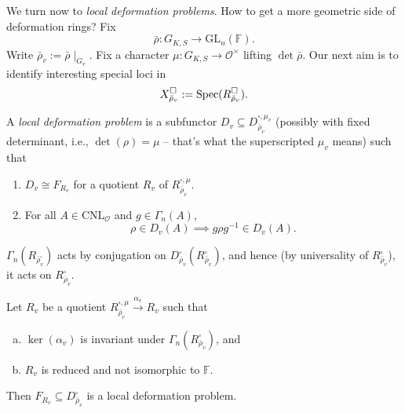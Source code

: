 \documentclass[reqno]{amsart} 
\begin{document}
We turn now to \emph{local deformation problems}.  How to get a more geometric side of deformation rings?  Fix
\begin{equation*}
  \bar{\rho} : G_{K, S} \rightarrow \mathrm{GL}_n(\mathbb{F}).
\end{equation*}
Write $\bar{\rho}_v := \bar{\rho} \mid_{G_v}$.  Fix a character $\mu : G_{K, S} \rightarrow \mathcal{O}^\times$ lifting $\det \bar{\rho}$.  Our next aim is to identify interesting special loci in
\begin{equation*}
  X_{\bar{\rho}_v}^{\square} := \operatorname{Spec}(R_{\bar{\rho}_v}^{\square}).
\end{equation*}
\begin{definition}\label{definition:cq6thpcze8}
  A \emph{local deformation problem} is a subfunctor $D_v \subseteq D_{\bar{\rho}_v}^{\square, \mu_v}$ (possibly with fixed determinant, i.e., $\det(\rho) = \mu$ -- that's what the superscripted $\mu_v$ means) such that
  \begin{enumerate}
  \item\label{enumerate:cq6s0pdihm} $D_v \cong F_{R_v}$ for a quotient $R_v$ of $R_{\bar{\rho}_v}^{\square, \mu}$.
  \item\label{enumerate:cq6s0pgpcr} For all $A \in \mathrm{CNL}_{\mathcal{O}}$ and $g \in \Gamma_n(A)$,
    \begin{equation*}
      \rho \in D_v(A) \implies g \rho g^{-1} \in D_v(A).
    \end{equation*}
  \end{enumerate}
\end{definition}
\begin{remark}
  $\Gamma_n(R_{\bar{\rho}_v^{\square}})$ acts by conjugation on $D_{\bar{\rho}_v}^{\square}(R_{\bar{\rho}_v}^{\square})$, and hence (by universality of $R_{\bar{\rho}_v}^{\square}$), it acts on $R_{\bar{\rho}_v}^{\square}$.
\end{remark}
\begin{proposition}\label{proposition:cq6thpcxtk}
  Let $R_v$ be a quotient $R_{\bar{\rho}_v}^{\square, \mu} \xrightarrow{\alpha_v} R_v$ such that
  \begin{enumerate}[(a)]
  \item\label{enumerate:cq6s0pxwwm} $\ker(\alpha_v)$ is invariant under $\Gamma_n(R_{\bar{\rho}_v}^{\square})$, and
  \item\label{enumerate:cq6s0pxv8b} $R_v$ is reduced and not isomorphic to $\mathbb{F}$.
  \end{enumerate}
  Then $F_{R_v} \subseteq D_{\bar{\rho}_v}^{\square}$ is a local deformation problem.
\end{proposition}
\end{document}
